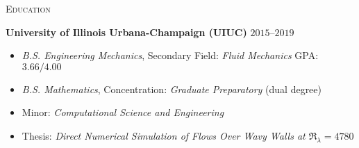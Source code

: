 \documentclass[10pt]{article}
\begin{document}
\begin{multicols}{2}
\textsc{Education}
\columnbreak

%
%
\textbf{University of Illinois Urbana-Champaign (UIUC)} \hfill $2015$--$2019$

\vspace{-1.75em}
\begin{itemize}[label= ,leftmargin=1.0em]
    \setlength\itemsep{-0.25em}
    \item \textit{B.S. Engineering Mechanics}, Secondary Field: \textit{Fluid Mechanics} \hfill GPA: $3.66/4.00$
    \item \textit{B.S. Mathematics}, Concentration: \textit{Graduate Preparatory} \hfill (dual degree)
    \item Minor: \textit{Computational Science and Engineering}
    \item Thesis: \textit{Direct Numerical Simulation of Flows Over Wavy Walls at $\Re_\lambda=4780$}
\end{itemize}
\vspace{-2.0em}

\end{multicols}
\vspace{-1.5em}
\end{document}
